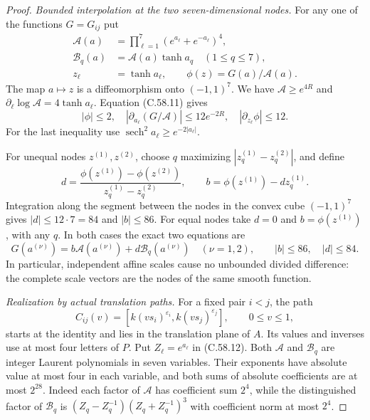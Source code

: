 \begin{proof}
\emph{Bounded interpolation at the two seven-dimensional nodes.}
For any one of the functions $G=G_{ij}$ put
\[
 \begin{split}
 \mathcal A(a)&=\prod_{\ell=1}^7
                         (e^{a_\ell}+e^{-a_\ell})^4,\\
 \mathcal B_q(a)&=\mathcal A(a)\tanh a_q
                                  \quad(1\leq q\leq7),\\
 z_\ell&=\tanh a_\ell,\qquad
                         \phi(z)=G(a)/\mathcal A(a).
 \end{split}                                            \tag{C.58.12}
\]
The map $a\mapsto z$ is a diffeomorphism onto $(-1,1)^7$.
We have $\mathcal A\geq e^{4R}$ and
$\partial_\ell\log\mathcal A=4\tanh a_\ell$.
Equation (C.58.11) gives
\[
 |\phi|\leq2,\quad
 |\partial_{a_\ell}(G/\mathcal A)|\leq12e^{-2R},
 \quad |\partial_{z_\ell}\phi|\leq12.                  \tag{C.58.13}
\]
For the last inequality use
$\operatorname{sech}^2a_\ell\geq e^{-2|a_\ell|}$.

For unequal nodes $z^{(1)},z^{(2)}$, choose $q$ maximizing
$|z_q^{(1)}-z_q^{(2)}|$, and define
\[
 d=\frac{\phi(z^{(1)})-\phi(z^{(2)})}
           {z_q^{(1)}-z_q^{(2)}},\qquad
                         b=\phi(z^{(1)})-d z_q^{(1)}.
 \]
Integration along the segment between the nodes in the
convex cube $(-1,1)^7$ gives $|d|\leq12\cdot7=84$
and $|b|\leq86$.
For equal nodes take $d=0$ and $b=\phi(z^{(1)})$,
with any $q$. In both cases the exact two equations are
\[
 G(a^{(\nu)})=
     b\mathcal A(a^{(\nu)})+d\mathcal B_q(a^{(\nu)})
 \quad(\nu=1,2),\qquad |b|\leq86,\quad |d|\leq84.
                                                               \tag{C.58.14}
\]
In particular, independent affine scales cause no
unbounded divided difference: the complete scale vectors
are the nodes of the same smooth function.

\emph{Realization by actual translation paths.}
For a fixed pair $i<j$, the path
\[
 C_{ij}(v)=
 [k(vs_i)^{\varepsilon_i},k(vs_j)^{\varepsilon_j}],
                    \qquad 0\leq v\leq1,               \tag{C.58.15}
\]
starts at the identity and lies in the translation
plane of $A$. Its values and inverses use at most
four letters of $P$.
Put $Z_\ell=e^{a_\ell}$ in (C.58.12).
Both $\mathcal A$ and $\mathcal B_q$ are integer Laurent
polynomials in seven variables.
Their exponents have absolute value at most four in
each variable, and both sums of absolute coefficients
are at most $2^{28}$.
Indeed each factor of $\mathcal A$ has coefficient sum
$2^4$, while the distinguished factor of $\mathcal B_q$
is $(Z_q-Z_q^{-1})(Z_q+Z_q^{-1})^3$ with coefficient
norm at most $2^4$.


\end{proof}
